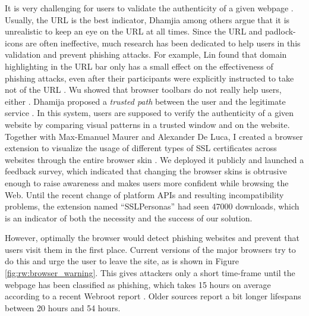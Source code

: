It is very challenging for users to validate the authenticity of a given webpage \cite{Dhamija2006WhyPhishingWorks, Fogg2001WhatMakesSitesCredible}. Usually, the URL is the best indicator, Dhamjia \etal among others argue that it is unrealistic to keep an eye on the URL at all times. Since the URL and padlock-icons are often ineffective, much research has been dedicated to help users in this validation and prevent phishing attacks. For example, Lin \etal found that domain highlighting in the URL bar only has a small effect on the effectiveness of phishing attacks, even after their participants were explicitly instructed to take not of the URL \cite{Lin2011DomainHighlighting}. Wu \etal showed that browser toolbars do not really help users, either \cite{Wu2006SecurityToolbars}. Dhamija \etal proposed a \textit{trusted path} between the user and the legitimate service \cite{Dhamija2005DynamicSecuritySkins}. In this system, users are supposed to verify the authenticity of a given website by comparing visual patterns in a trusted window and on the website. Together with Max-Emanuel Maurer and Alexander De Luca, I created a browser extension to visualize the usage of different types of SSL certificates across websites through the entire browser skin \cite{Maurer2011ShiningChrome}. We deployed it publicly and launched a feedback survey, which indicated that changing the browser skins is obtrusive enough to raise awareness and makes users more confident while browsing the Web. Until the recent change of platform APIs and resulting incompatibility problems, the extension named ``SSLPersonas'' had seen 47000 downloads, which is an indicator of both the necessity and the success of our solution. 

However, optimally the browser would detect phishing websites and prevent that users visit them in the first place. Current versions of the major browsers try to do this and urge the user to leave the site, as is shown in Figure \ref{fig:rw:browser_warning}. This gives attackers only a short time-frame until the webpage has been classified as phishing, which takes 15 hours on average according to a recent Webroot report \cite{Girtakovskis2017WebrootThreatReport}. Older sources report a bit longer lifespans between 20 hours and 54 hours. 

